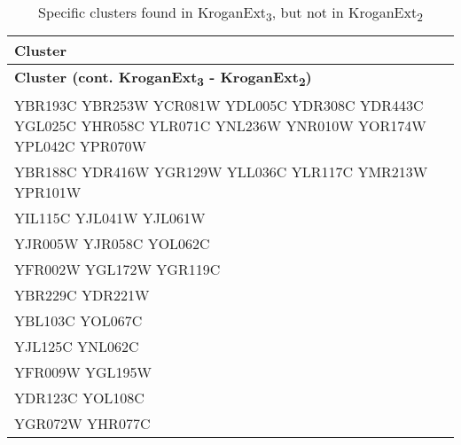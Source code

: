 \setlength{\extrarowheight}{2pt}
\renewcommand{\arraystretch}{1.2}
\begin{longtable}{| m{27em} |}
\caption{Specific clusters found in KroganExt\textsubscript{3}, but not in KroganExt\textsubscript{2}} \\
\hline
\textbf{Cluster} \\
\hline
\endfirsthead
\hline
\textbf{Cluster (cont. KroganExt\textsubscript{3} - KroganExt\textsubscript{2})} \\
\hline
\endhead
\hline
\endfoot
\hline
\endlastfoot
YBR193C YBR253W YCR081W YDL005C YDR308C YDR443C YGL025C YHR058C YLR071C YNL236W YNR010W YOR174W YPL042C YPR070W \\
\hline
YBR188C YDR416W YGR129W YLL036C YLR117C YMR213W YPR101W \\
\hline
YIL115C YJL041W YJL061W \\
\hline
YJR005W YJR058C YOL062C \\
\hline
YFR002W YGL172W YGR119C \\
\hline
YBR229C YDR221W \\
\hline
YBL103C YOL067C \\
\hline
YJL125C YNL062C \\
\hline
YFR009W YGL195W \\
\hline
YDR123C YOL108C \\
\hline
YGR072W YHR077C \\
\hline
\end{longtable}